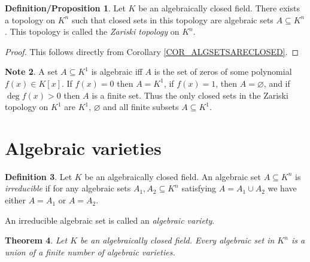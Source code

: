\documentclass[12pt, letterpaper, oneside]{article}
\theoremstyle{plain}
\newtheorem{theorem}{Theorem}[section]
\theoremstyle{definition}
\newtheorem{definition}[theorem]{Definition}
\newtheorem{note}[theorem]{Note}
\newtheorem{definition/proposition}[theorem]{Definition/Proposition}
\newcommand{\vs}{\vskip 5mm}
\begin{document}
\begin{definition/proposition}
Let $K$ be an algebraically closed field. There exists a topology on $K^{n}$ such that 
closed sets in this topology are algebraic sets $A\subseteq K^{n}$. This topology is called 
the \emph{Zariski topology} on $K^{n}$.  
\end{definition/proposition}

\vs

\begin{proof}
This follows directly from Corollary \ref{COR_ALGSETSARECLOSED}.
\end{proof}

\vs\vs

\begin{note}
A set $A\subseteq K^{1}$ is algebraic iff $A$ is the set of zeros of some polynomial 
$f(x)\in K[x]$. If $f(x) = 0$ then $A= K^{1}$, if $f(x) = 1$, then $A= \varnothing$, and
if $\deg f(x) > 0$ then  $A$ is a finite set. Thus the only closed sets in the Zariski topology 
on $K^{1}$ are $K^{1}$, $\varnothing$ and  all finite subsets $A\subseteq K^{1}$.   
\end{note}





\newpage
\section{Algebraic varieties}
\label{SEC_ALGVARIETIES}

\begin{definition}
Let $K$ be an algebraically closed field. An algebraic set $A\subseteq K^{n}$ is 
\emph{irreducible} if for any algebraic sets $A_{1}, A_{2}\subseteq K^{n}$ satisfying 
$A= A_{1}\cup A_{2}$ we have either $A=A_{1}$ or $A= A_{2}$. 

An irreducible algebraic set is called an \emph{algebraic variety}.
\end{definition}

\vs\vs

\begin{theorem}
\label{THM_ALGSETIRREDDECOMP}
Let $K$ be an algebraically closed field. Every algebraic set in $K^{n}$ is a union 
of a finite number of algebraic varieties. 
\end{theorem}
\end{document}
